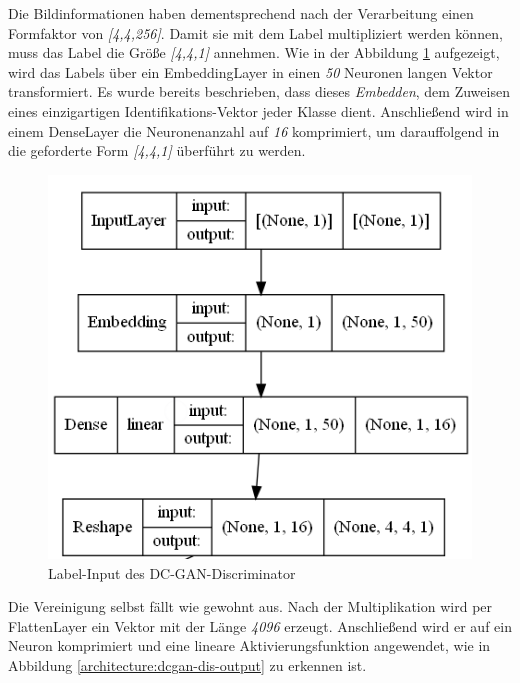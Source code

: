 Die Bildinformationen haben dementsprechend nach der Verarbeitung einen Formfaktor von \textit{[4,4,256]}.
Damit sie mit dem Label multipliziert werden können, muss das Label die Größe \textit{[4,4,1]} annehmen.
Wie in der Abbildung \ref{architecture:dcgan-dis-label} aufgezeigt, wird das Labels über ein EmbeddingLayer in einen \textit{50} Neuronen langen Vektor transformiert.
Es wurde bereits beschrieben, dass dieses \textit{Embedden}, dem Zuweisen eines einzigartigen Identifikations-Vektor jeder Klasse dient.
Anschließend wird in einem DenseLayer die Neuronenanzahl auf \textit{16} komprimiert, um darauffolgend in die geforderte Form \textit{[4,4,1]} überführt zu werden.

\begin{figure}[H]
	\centering
	\includegraphics[height=0.3\textheight]{kapitel/5_ergebnisse/architectures/dcgan_disriminator/bild_input.png}
	\caption{Label-Input des DC-GAN-Discriminator}
	\label{architecture:dcgan-dis-label}
\end{figure}

Die Vereinigung selbst fällt wie gewohnt aus.
Nach der Multiplikation wird per FlattenLayer ein Vektor mit der Länge \textit{4096} erzeugt.
Anschließend wird er auf ein Neuron komprimiert und eine lineare Aktivierungsfunktion angewendet, wie in Abbildung \ref{architecture:dcgan-dis-output} zu erkennen ist.

